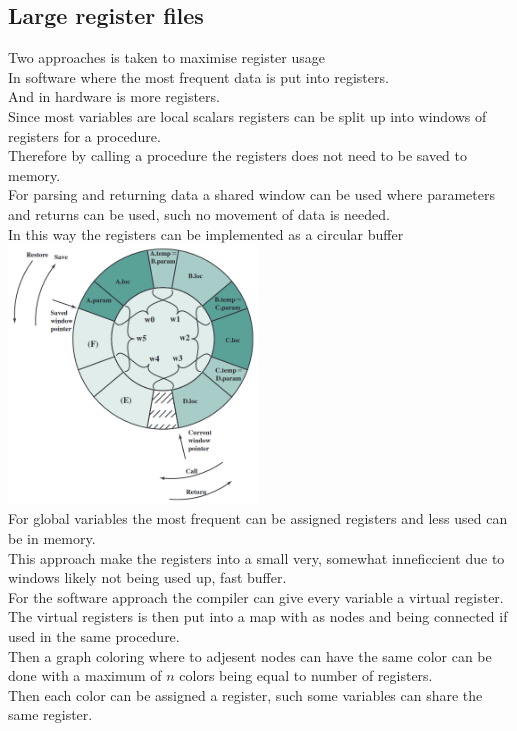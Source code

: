 \documentclass[12pt, a4paper]{article}
\begin{document}
		\subsection{Large register files}
			Two approaches is taken to maximise register usage\\
			In software where the most frequent data is put into registers.\\
			And in hardware is more registers.\\
			Since most variables are local scalars registers can be split up into windows of registers for a procedure.\\
			Therefore by calling a procedure the registers does not need to be saved to memory.\\
			For parsing and returning data a shared window can be used where parameters and returns can be used, such no movement of data is needed.\\
			In this way the registers can be implemented as a circular buffer\\
			\includegraphics[width=250px]{assets/registerBuffer.png}\\
			For global variables the most frequent can be assigned registers and less used can be in memory.\\
			This approach make the registers into a small very, somewhat inneficcient due to windows likely not being used up, fast buffer.\\[4mm]
			For the software approach the compiler can give every variable a virtual register.\\
			The virtual registers is then put into a map with as nodes and being connected if used in the same procedure.\\
			Then a graph coloring where to adjesent nodes can have the same color can be done with a maximum of $n$ colors being equal to number of registers.\\
			Then each color can be assigned a register, such some variables can share the same register.
\end{document}
